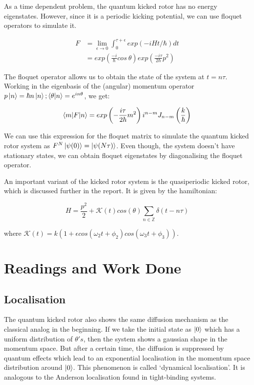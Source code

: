 \documentclass[twocolumn]{report}
\begin{document}
As a time dependent problem, the quantum kicked rotor has no energy eigenstates.
However, since it is a periodic kicking potential, we can use floquet operators
to simulate it.

\begin{align}
    F &= \lim_{\epsilon \to 0} \int_{0}^{\tau + \epsilon} exp(-iHt/\hbar) dt\\
    &= exp\left(\frac{-i}{\hbar} cos\ \theta\right)
    exp\left(\frac{-i\tau}{2\hbar}p^2\right)
\end{align}

The floquet operator allows us to obtain the state of the system at $t = n\tau$.
Working in the eigenbasis of the (angular) momentum operator
$p \ket{n} = \hbar n \ket{n}; \braket{\theta | n} = e^{in\theta}$, we get:

\begin{equation}
    \braket{m | F | n} = exp\left(-\frac{i \tau}{2\hbar}m^2\right) i^{n-m}
    J_{n-m}\left(\frac{k}{\hbar}\right)
\end{equation}

We can use this expression for the floquet matrix to simulate the quantum
kicked rotor system as $F^N \ket{\psi(0)} = \ket{\psi(N\tau)}$. Even though,
the system doesn't have stationary states, we can obtain floquet eigenstates
by diagonalising the floquet operator.

An important variant of the kicked rotor system is the quasiperiodic kicked
rotor, which is discussed further in the report. It is given by the
hamiltonian:

\begin{equation}
H = \frac{p^2}{2} + \mathcal{K}(t) cos(\theta)\sum_{n \in \mathbb{Z}}
\delta(t - n\tau)
\end{equation}

where $\mathcal{K}(t) = k(1 + \epsilon cos(\omega_2 t + \phi_2)
cos(\omega_3 t + \phi_3))$.

\chapter{Readings and Work Done}
\section{Localisation}
The quantum kicked rotor also shows the same diffusion mechanism as the
classical analog in the beginning. If we take the initial state as $\ket{0}$
which has a uniform distribution of $\theta's$, then the system shows a
gaussian shape in the momentum space. But after a certain time, the
diffusion is suppressed by quantum effects which lead to an exponential
localisation in the momentum space distribution around $\ket{0}$. This
phenomenon is called `dynamical localisation'. It is analogous to the
Anderson localisation found in tight-binding systems.
\end{document}
